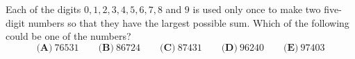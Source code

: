 Each of the digits $0,1,2,3,4,5,6,7,8$ and $9$ is used only once to make two five-digit numbers so that they have the largest possible sum. Which of the following could be one of the numbers?
\[\textbf{(A)}\ 76531\qquad\textbf{(B)}\ 86724\qquad\textbf{(C)}\ 87431\qquad\textbf{(D)}\ 96240\qquad\textbf{(E)}\ 97403\]
